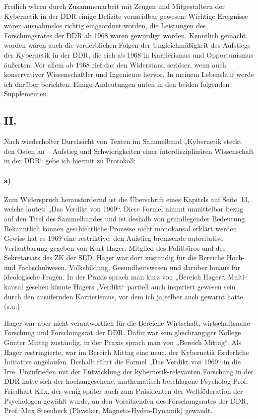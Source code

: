 \documentclass[11pt,a4paper]{article}
\begin{document}
Freilich wären durch Zusammenarbeit mit Zeugen und Mitgestaltern der
Kybernetik in der DDR einige Defizite vermeidbar gewesen: Wichtige Ereignisse
wären ausnahmslos richtig eingeordnet worden, die Leistungen des
Forschungsrates der DDR ab 1968 wären gewürdigt worden. Kenntlich gemacht
worden wären auch die verderblichen Folgen der Ungleichmäßigkeit des Aufstiegs
der Kybernetik in der DDR, die sich ab 1968 in Karrierismus und Opportunismus
äußerten. Vor allem ab 1968 rief das den Widerstand seriöser, wenn auch
konservativer Wissenschaftler und Ingenieure hervor. In meinem Lebenslauf
werde ich darüber berichten. Einige Andeutungen unten in den beiden folgenden
Supplementen.

\subsection*{II.}

Nach wiederholter Durchsicht von Texten im Sammelband „Kybernetik steckt den
Osten an – Aufstieg und Schwierigkeiten einer interdisziplinären Wissenschaft
in der DDR“ gebe ich hiermit zu Protokoll:

\paragraph{a)}
Zum Widerspruch herausfordernd ist die Überschrift eines Kapitels auf
Seite~13, welche lautet: „Das Verdikt von 1969“. Diese Formel nimmt
unmittelbar bezug auf den Titel des Sammelbandes und ist deshalb von
grundlegender Bedeutung. Bekanntlich können geschichtliche Prozesse nicht
monokausal erklärt werden. Gewiss hat es 1969 eine restriktive, den Aufstieg
bremsende autoritative Verlautbarung gegeben von Kurt Hager, Mitglied des
Politbüros und des Sekretariats des ZK der SED. Hager war dort zuständig für
die Bereiche Hoch- und Fachschulwesen, Volksbildung, Gesundheitswesen und
darüber hinaus für ideologische Fragen. In der Praxis sprach man kurz von
„Bereich Hager“. Multi-kausal gesehen könnte Hagers „Verdikt“ partiell auch
inspiriert gewesen sein durch den ausufernden Karrierismus, vor dem ich ja
selber auch gewarnt hatte. (s.u.)

Hager war aber nicht verantwortlich für die Bereiche Wirtschaft,
wirtschaftsnahe Forschung und Forschungsrat der DDR. Dafür war sein
gleichrangiger Kollege Günter Mittag zuständig, in der Praxis sprach man von
„Bereich Mittag“. Als Hager restringierte, war im Bereich Mittag eine neue,
der Kybernetik förderliche Initiative angelaufen. Deshalb führt die Formel
„Das Verdikt von 1969“ in die Irre. Unzufrieden mit der Entwicklung der
kybernetik-relevanten Forschung in der DDR hatte sich der hochangesehene,
mathematisch beschlagene Psycholog Prof. Friedhart Klix, der wenig später auch
zum Präsidenten der Weltföderation der Psychologen gewählt wurde, an den
Vorsitzenden des Forschungsrates der DDR, Prof. Max Steenbeck (Physiker,
Magneto-Hydro-Dynamik) gewandt.
\end{document}
